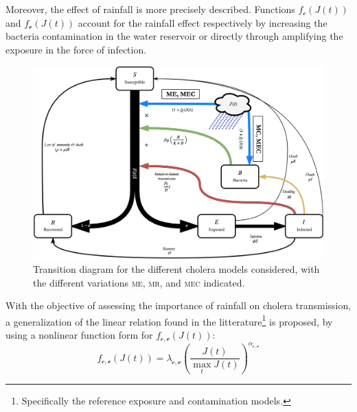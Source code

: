 Moreover, the effect of rainfall is more precisely described. Functions $f_{\mathcal{c}}\left(J(t)\right)$ and $f_{\mathcal{e}}\left(J(t)\right)$ account for the rainfall effect respectively by increasing the bacteria contamination in the water reservoir or directly through amplifying the exposure in the force of infection.
\begin{figure}
  \centering
  \includegraphics{fig_cholera-rainfall/Lemaitre_ACTROP_2018_42_R1_fig1.png}
  \caption[Transition diagram for the competing cholera models]{Transition diagram for the different cholera models considered, with the different variations \textsc{me}, \textsc{mr}, and \textsc{mec} indicated.}
  \label{diagram}
\end{figure}
With the objective of assessing the importance of rainfall on cholera transmission, a generalization of the linear relation found in the litterature\footnote{Specifically the reference exposure \parencite{Eisenberg:ExaminingRainfallCholera:2013} and contamination \parencite{Rinaldo:Reassessment20102011:2012} models.} is proposed, by using a nonlinear function form for  $f_{\mathcal{c,e}}\left(J(t)\right)$:
\begin{equation}
    f_{\mathcal{c,e}}\left(J(t)\right)=\lambda_{\mathcal{c,e}} \left(\frac{J(t)}{\max_t J(t)}\right)^{\alpha_{\mathcal{c,e}}}
    \label{eq:nonlinear_rain}
\end{equation}
